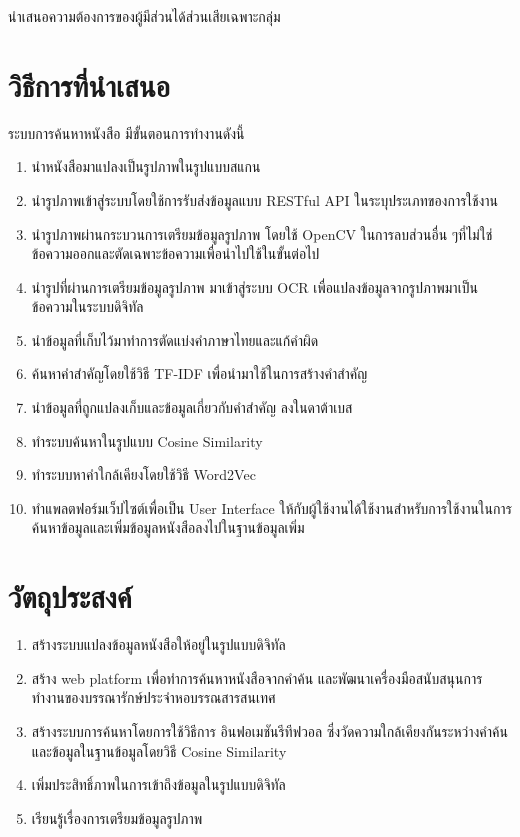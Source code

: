นำเสนอความต้องการของผู้มีส่วนได้ส่วนเสียเฉพาะกลุ่ม 

\section{วิธีการที่นำเสนอ}

ระบบการค้นหาหนังสือ มีขั้นตอนการทำงานดังนี้

\begin{enumerate}
    \item นำหนังสือมาแปลงเป็นรูปภาพในรูปแบบสแกน
    \item นำรูปภาพเข้าสู่ระบบโดยใช้การรับส่งข้อมูลแบบ RESTful API ในระบุประเภทของการใช้งาน
    \item นำรูปภาพผ่านกระบวนการเตรียมข้อมูลรูปภาพ โดยใช้ OpenCV ในการลบส่วนอื่น ๆที่ไม่ใช่ข้อความออกและตัดเฉพาะข้อความเพื่อนำไปใช้ในขั้นต่อไป
    \item นำรูปที่ผ่านการเตรียมข้อมูลรูปภาพ มาเข้าสู่ระบบ OCR เพื่อแปลงข้อมูลจากรูปภาพมาเป็นข้อความในระบบดิจิทัล
    \item นำข้อมูลที่เก็บไว้มาทำการตัดแบ่งคำภาษาไทยและแก้คำผิด
    \item ค้นหาคำสำคัญโดยใช้วิธี TF-IDF เพื่อนำมาใช้ในการสร้างคำสำคัญ 
    \item นำข้อมูลที่ถูกแปลงเก็บและข้อมูลเกี่ยวกับคำสำคัญ ลงในดาต้าเบส 
    \item ทำระบบค้นหาในรูปแบบ Cosine Similarity
    \item ทำระบบหาคำใกล้เคียงโดยใช้วิธี Word2Vec
    \item ทำแพลตฟอร์มเว็ปไซต์เพื่อเป็น User Interface ให้กับผู้ใช้งานได้ใช้งานสำหรับการใช้งานในการค้นหาข้อมูลและเพิ่มข้อมูลหนังสือลงไปในฐานข้อมูลเพิ่ม
\end{enumerate}
\section{วัตถุประสงค์}
\begin{enumerate}
    \item สร้างระบบแปลงข้อมูลหนังสือให้อยู่ในรูปแบบดิจิทัล
    \item สร้าง web platform เพื่อทำการค้นหาหนังสือจากคำค้น และพัฒนาเครื่องมือสนับสนุนการทำงานของบรรณารักษ์ประจำหอบรรณสารสนเทศ
    \item สร้างระบบการค้นหาโดยการใช้วิธีการ อินฟอเมชันรีทีฟวอล ซึ่งวัดความใกล้เคียงกันระหว่างคำค้นและข้อมูลในฐานข้อมูลโดยวิธี Cosine Similarity
    \item เพิ่มประสิทธิ์ภาพในการเข้าถึงข้อมูลในรูปแบบดิจิทัล
    \item เรียนรู้เรื่องการเตรียมข้อมูลรูปภาพ
\end{enumerate}
